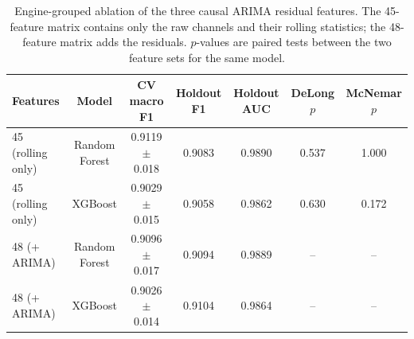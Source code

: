 \begin{table}[H]
\centering
\caption{Engine-grouped ablation of the three causal ARIMA residual features. The
45-feature matrix contains only the raw channels and their rolling statistics; the
48-feature matrix adds the residuals. \(p\)-values are paired tests between the two
feature sets for the same model.}
\label{tab:iot-ablation}
\small
\begin{tabular}{lcccccc}
\toprule
Features & Model & CV macro F1 & Holdout F1 & Holdout AUC & DeLong \(p\) & McNemar \(p\) \\
\midrule
45 (rolling only) & Random Forest & 0.9119 $\pm$ 0.018 & 0.9083 & 0.9890 & 0.537 & 1.000 \\
45 (rolling only) & XGBoost & 0.9029 $\pm$ 0.015 & 0.9058 & 0.9862 & 0.630 & 0.172 \\
48 (+ ARIMA) & Random Forest & 0.9096 $\pm$ 0.017 & 0.9094 & 0.9889 & -- & -- \\
48 (+ ARIMA) & XGBoost & 0.9026 $\pm$ 0.014 & 0.9104 & 0.9864 & -- & -- \\
\bottomrule
\end{tabular}
\end{table}

